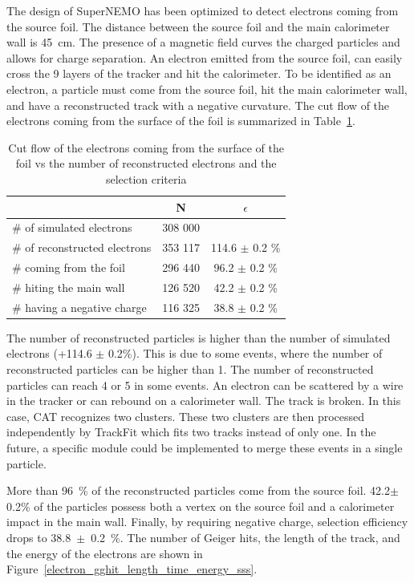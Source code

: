 \documentclass[main.tex]{subfiles}
\begin{document}
\noindent The design of SuperNEMO has been optimized to detect electrons coming from the source foil. The distance between the source foil and the main calorimeter wall is 45~cm. The presence of a magnetic field curves the charged particles and allows for charge separation. An electron emitted from the source foil, can easily cross the 9 layers of the tracker and hit the calorimeter. To be identified as an electron, a particle must come from the source foil, hit the main calorimeter wall, and have a reconstructed track with a negative curvature. The cut flow of the electrons coming from the surface of the foil is summarized in Table~\ref{Cutflowelectron}.


\begin{table}[h!]
\begin{center}
\begin{tabular}{l|c|c}
 & N & $\epsilon$ \\
\toprule
$\#$ of simulated electrons & 308 000 & \\
\hline
$\#$ of reconstructed electrons & 353 117 & 114.6 $\pm$ 0.2 \%\\
$\#$ coming from the foil       & 296 440 & 96.2  $\pm$ 0.2 \%\\
$\#$ hiting the main wall       & 126 520 & 42.2  $\pm$ 0.2 \%\\
$\#$ having a negative charge  & 116 325  & 38.8  $\pm$ 0.2 \%\\
\bottomrule
\end{tabular}
\end{center}
\caption{Cut flow of the electrons coming from the surface of the foil vs the number of reconstructed electrons and the selection criteria}
\label{Cutflowelectron}
\end{table}


\noindent The number of reconstructed particles is higher than the number of simulated electrons (+114.6 $\pm$ 0.2\%). This is due to some events, where the number of reconstructed particles can be higher than 1. The number of reconstructed particles can reach 4 or 5 in some events. An electron can be scattered by a wire in the tracker or can rebound on a calorimeter wall. The track is broken. In this case, CAT recognizes two clusters. These two clusters are then processed independently by TrackFit which fits two tracks instead of only one. In the future, a specific module could be implemented to merge these events in a single particle. 


\bigskip


\noindent More than 96~\% of the reconstructed particles come from the source foil. 42.2$\pm$0.2\% of the particles possess both a vertex on the source foil and a calorimeter impact in the main wall. Finally, by requiring negative charge, selection efficiency drops to 38.8~$\pm$~0.2~$\%$.  The number of Geiger hits, the length of the track, and the energy of the electrons are shown in Figure~\ref{electron_gghit_length_time_energy_sss}.
\end{document}
